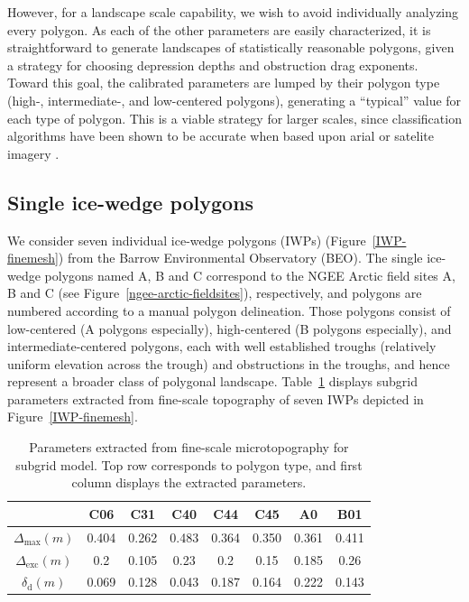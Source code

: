 \documentclass[review,11pt]{elsarticle}
\begin{document}
However, for a landscape scale capability, we wish to avoid individually analyzing every polygon.
As each of the other parameters are easily characterized, it is straightforward to generate landscapes of statistically reasonable polygons, given a strategy for choosing depression depths and obstruction drag exponents.
Toward this goal, the calibrated parameters are lumped by their polygon type (high-, intermediate-, and low-centered polygons), generating a ``typical'' value for each type of polygon.
This is a viable strategy for larger scales, since classification algorithms have been shown to be accurate when based upon arial or satelite imagery \cite{Skurikhin2013}.


%
\FloatBarrier
\subsection{Single ice-wedge polygons}\label{numerical-tests-single}

We consider seven individual ice-wedge polygons (IWPs) (Figure~\ref{IWP-finemesh}) from the Barrow Environmental Observatory (BEO).
The single ice-wedge polygons named A, B and C correspond to the NGEE Arctic field sites A, B and C (see Figure~\ref{ngee-arctic-fieldsites}), respectively, and polygons are numbered according to a manual polygon delineation.
Those polygons consist of low-centered (A polygons especially), high-centered (B polygons especially), and intermediate-centered polygons, each with well established troughs (relatively uniform elevation across the trough) and obstructions in the troughs, and hence represent a broader class of polygonal landscape.
Table~\ref{subgrid-parameters} displays subgrid parameters extracted from fine-scale topography of seven IWPs depicted in Figure~\ref{IWP-finemesh}.
%
\begin{center}
\begin{table}[htbp]
\caption{Parameters extracted from fine-scale microtopography for subgrid model. Top row corresponds to polygon type, and first column displays the extracted parameters.}\label{subgrid-parameters}
\begin{tabular}{| c |c|c|c|c|c|c|c|}
\hline
& C06 & C31 & C40 & C44 & C45 & A0 & B01 \\ \hline
 $\Delta_\text{max}(m)$ & 0.404 & 0.262 & 0.483 & 0.364 & 0.350 & 0.361 & 0.411 \\ \hline
$\Delta_\text{exc}(m)$ & 0.2 & 0.105 & 0.23 & 0.2 & 0.15 & 0.185 & 0.26\\ \hline
$ \delta_\text{d}(m)$ & 0.069 & 0.128 & 0.043 & 0.187 & 0.164 & 0.222 & 0.143 \\ \hline
\end{tabular}
\end{table}
\end{center}%
\end{document}
